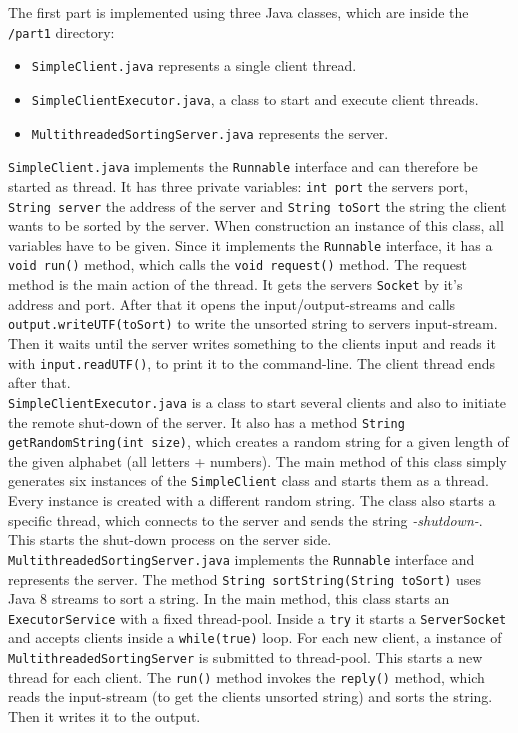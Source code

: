 \documentclass{article}
\begin{document}
    The first part is implemented using three Java classes, which are inside the \texttt{/part1} directory:
    \begin{itemize}
      \item \texttt{SimpleClient.java} represents a single client thread.
      \item \texttt{SimpleClientExecutor.java}, a class to start and execute client threads.
      \item \texttt{MultithreadedSortingServer.java} represents the server.
    \end{itemize}
    \texttt{SimpleClient.java} implements the \texttt{Runnable} interface and can therefore be started as thread. It has three private variables: \texttt{int port} the servers port, \texttt{String server} the address of the server and \texttt{String toSort} the string the client wants to be sorted by the server. When construction an instance of this class, all variables have to be given. Since it implements the \texttt{Runnable} interface, it has a \texttt{void run()} method, which calls the \texttt{void request()} method. The request method is the main action of the thread. It gets the servers \texttt{Socket} by it's address and port. After that it opens the input/output-streams and calls \texttt{output.writeUTF(toSort)} to write the unsorted string to servers input-stream. Then it waits until the server writes something to the clients input and reads it with \texttt{input.readUTF()}, to print it to the command-line. The client thread ends after that.\\
    \texttt{SimpleClientExecutor.java} is a class to start several clients and also to initiate the remote shut-down of the server. It also has a method \texttt{String getRandomString(int size)}, which creates a random string for a given length of the given alphabet (all letters + numbers). The main method of this class simply generates six instances of the \texttt{SimpleClient} class and starts them as a thread. Every instance is created with a different random string. The class also starts a specific thread, which connects to the server and sends the string \textit{-shutdown-}. This starts the shut-down process on the server side.\\
    \texttt{MultithreadedSortingServer.java} implements the \texttt{Runnable} interface and represents the server. The method \texttt{String sortString(String toSort)} uses Java 8 streams to sort a string. In the main method, this class starts an \texttt{ExecutorService} with a fixed thread-pool. Inside a \texttt{try} it starts a \texttt{ServerSocket} and accepts clients inside a \texttt{while(true)} loop. For each new client, a instance of \texttt{MultithreadedSortingServer} is submitted to thread-pool. This starts a new thread for each client. The \texttt{run()} method invokes the \texttt{reply()} method, which reads the input-stream (to get the clients unsorted string) and sorts the string. Then it writes it to the output.\\
\end{document}

